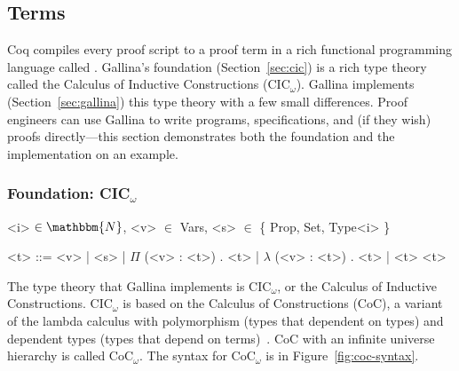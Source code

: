 \subsection{Terms}
\label{sec:mot-coq}


Coq compiles every proof script to a proof term in a rich functional programming language called .
Gallina's foundation (Section~\ref{sec:cic}) is a rich type theory called the Calculus of Inductive Constructions (CIC$_{\omega}$).
Gallina implements (Section~\ref{sec:gallina}) this type theory with a few small differences.
Proof engineers can use Gallina to write programs, specifications, and (if they wish) proofs directly---this section
demonstrates both the foundation and the implementation on an example.


\subsubsection{Foundation: CIC$_{\omega}$}

\begin{figure*}
\small
\begin{grammar}
<i> $\in \mathbbm{N}$, <v> $\in$ Vars, <s> $\in$ \{ Prop, Set, Type<i> \}

<t> ::= <v> \hspace{0.06cm} | \hspace{0.06cm} <s> \hspace{0.06cm} | \hspace{0.06cm} $\Pi$ (<v> : <t>) . <t> \hspace{0.06cm} | \hspace{0.06cm} $\lambda$ (<v> : <t>) . <t> \hspace{0.06cm} | \hspace{0.06cm} <t> <t>
\end{grammar}
\vspace{-0.3cm}
\caption{Syntax for CoC$_\omega$ with (from left to right) variables, sorts, dependent types, functions, and application.}
\label{fig:coc-syntax}
\end{figure*}

The type theory that Gallina implements is CIC$_{\omega}$, or the Calculus of Inductive Constructions.
CIC$_{\omega}$ is based on the Calculus of Constructions (CoC), a variant of the lambda calculus with polymorphism (types that dependent on types) and dependent types (types that depend on terms)~\cite{coquand:inria-00076024}.
CoC with an infinite universe hierarchy is called CoC$_{\omega}$. %
The syntax for CoC$_{\omega}$ is in Figure~\ref{fig:coc-syntax}.


